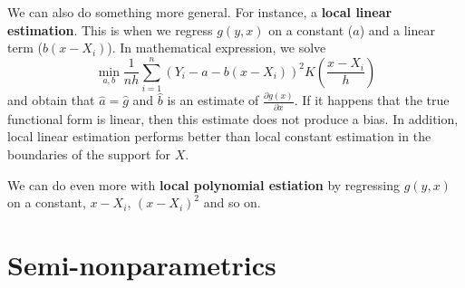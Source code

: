  We can also do something more general. For instance, a \textbf{local linear estimation}. This is when we regress $g(y,x)$ on a constant ($a$) and a linear term ($b(x-X_i)$). In mathematical expression, we solve
 \[
 \min_{a,b}\frac{1}{nh}\sum_{i=1}^n(Y_i-a-b(x-X_i))^2K\left(\frac{x-X_i}{h}\right)
 \]
 and obtain that $\hat{a}=\hat{g}$ and $\hat{b}$ is an estimate of $\frac{\partial g(x)}{\partial x}$. If it happens that the true functional form is linear, then this estimate does not produce a bias. In addition, local linear estimation performs better than local constant estimation in the boundaries of the support for $X$. \par
 We can do even more with \textbf{local polynomial estiation} by regressing $g(y,x)$ on a constant, $x-X_i$, $(x-X_i)^2$ and so on. 
 \section{Semi-nonparametrics}
